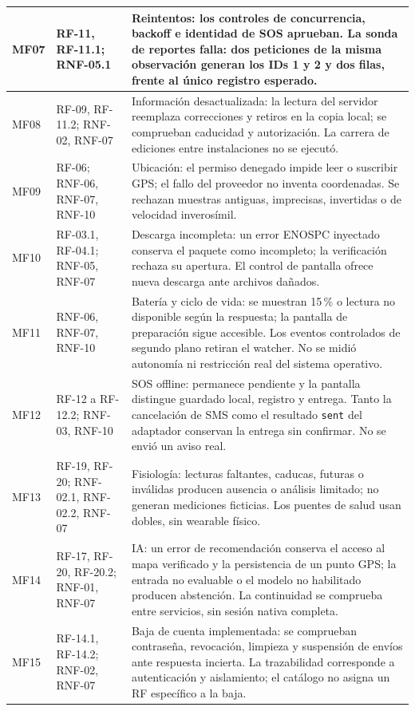 \begin{longtable}{|p{1.15cm}|p{3.25cm}|p{9.35cm}|}
\hline
MF07 & RF-11, RF-11.1; RNF-05.1 & Reintentos: los controles de concurrencia, backoff e identidad de SOS aprueban. La sonda de reportes falla: dos peticiones de la misma observación generan los IDs 1 y 2 y dos filas, frente al único registro esperado. \\
\hline
MF08 & RF-09, RF-11.2; RNF-02, RNF-07 & Información desactualizada: la lectura del servidor reemplaza correcciones y retiros en la copia local; se comprueban caducidad y autorización. La carrera de ediciones entre instalaciones no se ejecutó. \\
\hline
MF09 & RF-06; RNF-06, RNF-07, RNF-10 & Ubicación: el permiso denegado impide leer o suscribir GPS; el fallo del proveedor no inventa coordenadas. Se rechazan muestras antiguas, imprecisas, invertidas o de velocidad inverosímil. \\
\hline
MF10 & RF-03.1, RF-04.1; RNF-05, RNF-07 & Descarga incompleta: un error ENOSPC inyectado conserva el paquete como incompleto; la verificación rechaza su apertura. El control de pantalla ofrece nueva descarga ante archivos dañados. \\
\hline
MF11 & RNF-06, RNF-07, RNF-10 & Batería y ciclo de vida: se muestran 15\,\% o lectura no disponible según la respuesta; la pantalla de preparación sigue accesible. Los eventos controlados de segundo plano retiran el watcher. No se midió autonomía ni restricción real del sistema operativo. \\
\hline
MF12 & RF-12 a RF-12.2; RNF-03, RNF-10 & SOS offline: permanece pendiente y la pantalla distingue guardado local, registro y entrega. Tanto la cancelación de SMS como el resultado \texttt{sent} del adaptador conservan la entrega sin confirmar. No se envió un aviso real. \\
\hline
MF13 & RF-19, RF-20; RNF-02.1, RNF-02.2, RNF-07 & Fisiología: lecturas faltantes, caducas, futuras o inválidas producen ausencia o análisis limitado; no generan mediciones ficticias. Los puentes de salud usan dobles, sin wearable físico. \\
\hline
MF14 & RF-17, RF-20, RF-20.2; RNF-01, RNF-07 & IA: un error de recomendación conserva el acceso al mapa verificado y la persistencia de un punto GPS; la entrada no evaluable o el modelo no habilitado producen abstención. La continuidad se comprueba entre servicios, sin sesión nativa completa. \\
\hline
MF15 & RF-14.1, RF-14.2; RNF-02, RNF-07 & Baja de cuenta implementada: se comprueban contraseña, revocación, limpieza y suspensión de envíos ante respuesta incierta. La trazabilidad corresponde a autenticación y aislamiento; el catálogo no asigna un RF específico a la baja. \\
\hline
\end{longtable}
\endgroup

